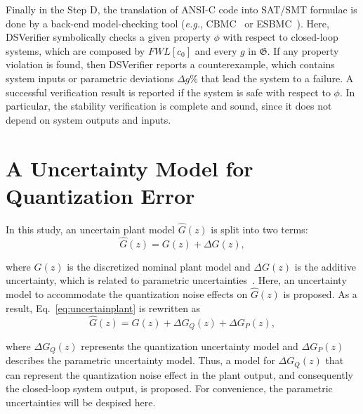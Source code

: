 \documentclass{sig-alternate-05-2015}
\begin{document}
Finally in the Step D, the translation of ANSI-C code into SAT/SMT formulae is done by a back-end model-checking tool ({\it e.g.}, CBMC~\cite{ClarkeKL04} or ESBMC~\cite{CordeiroFM12}). Here, DSVerifier symbolically checks a given property $\phi$ with respect to closed-loop systems, which are composed by $FWL[c_0]$ and every $g$ in $\mathfrak{G}$. If any property violation is found, then DSVerifier reports a counterexample, which contains system inputs or parametric deviations $\Delta{g}\%$ that lead the system to a failure. A successful verification result is reported if the system is safe with respect to $\phi$. In particular, the stability verification is complete and sound, since it does not depend on system outputs and inputs.

\section{A Uncertainty Model for Quantization Error} 
\label{sec:uncertainty-model-quantization-error}

In this study, an uncertain plant model $\hat{G}(z)$ is split into two terms:
%
\begin{equation}
\label{eq:uncertainplant}
\hat{G}(z)=G(z)+\Delta{G(z)},
\end{equation}

\noindent where $G(z)$ is the discretized nominal plant model and $\Delta{G(z)}$ is the additive uncertainty, which is related to parametric uncertainties~\cite{Bessa16}. Here, an uncertainty model to accommodate the quantization noise effects on $\hat{G}(z)$ is proposed. As a result, Eq.~\eqref{eq:uncertainplant} is rewritten as
%
\begin{equation}
\label{eq:uncertainFWLplant}
\hat{G}(z)=G(z)+\Delta{G_{Q}(z)}+\Delta{G_{P}(z)},
\end{equation}

\noindent where $\Delta{G_{Q}(z)}$ represents the quantization uncertainty model and $\Delta{G_{P}(z)}$ describes the parametric uncertainty model. Thus, a model for $\Delta{G_{Q}(z)}$ that can represent the quantization noise effect in the plant output, and consequently the closed-loop system output, is proposed. For convenience, the parametric uncertainties will be despised here.
\end{document}
